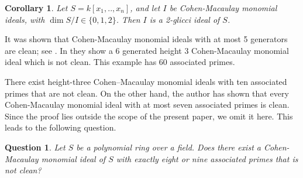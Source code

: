 \documentclass[11pt,letterpaper]{amsart}
\theoremstyle{plain}
\newtheorem{cor}[thm]{Corollary}
\newtheorem{question}[thm]{Question}
\theoremstyle{definition}
\theoremstyle{remark}
\begin{document}
\begin{cor}
    Let $S=k[x_1,..,x_n]$, and let $I$ be Cohen-Macaulay monomial ideals, with $\dim S/I\in\{0,1,2\}$. Then $I$ is a 2-glicci ideal of $S$.
\end{cor}

It was shown that Cohen-Macaulay monomial ideals with at most 5 generators are clean; see \cite[Theorem~1.2]{enomoto2019cleanness}. In \cite[Example~2.8]{enomoto2019cleanness} they show a 6 generated height 3 Cohen-Macaulay monomial ideal which is not clean. This example has 60 associated primes. 


There exist height-three Cohen--Macaulay monomial ideals
with ten associated primes that are not clean. On the
other hand, the author has shown that every
Cohen-Macaulay monomial ideal with at most seven
associated primes is clean. Since the proof lies
outside the scope of the present paper, we omit it
here. This leads to the following question.

\begin{question}\label{minimalassquestion} Let $S$ be a polynomial ring over a field. Does there exist a Cohen-Macaulay monomial ideal of $S$ with exactly eight or nine associated primes that is not clean? \end{question}
\end{document}
